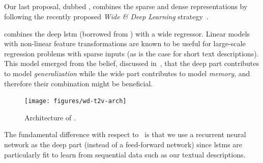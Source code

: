 %
%

\subsection{\widedeepttv{}}
\label{subsec:t2v:wd-t2v}

Our last proposal, dubbed \widedeepttv{}, combines the sparse and dense representations by following the recently proposed \emph{Wide \& Deep Learning} strategy~\cite{cheng2016wide}.

\widedeepttv{} combines the deep \gls{lstm} (borrowed from \densettv{}) with a wide regressor.
Linear models with non-linear feature transformations are known to be useful for large-scale regression problems with sparse inputs (as is the case for short text descriptions).
This model emerged from the belief, discussed in~\cite{cheng2016wide}, that the deep part contributes to model \emph{generalization} while the wide part contributes to model \emph{memory}, and therefore their combination might be beneficial.
%
\begin{figure}
\texttt{[image: figures/wd-t2v-arch]}
\caption{Architecture of \widedeepttv{}.}
\label{fig:t2v:widendeep}
\end{figure}
%
The fundamental difference with respect to~\cite{cheng2016wide} is that we use a recurrent neural network as the deep part (instead of a feed-forward network) since \glspl{lstm} are particularly fit to learn from sequential data such as our textual descriptions.

